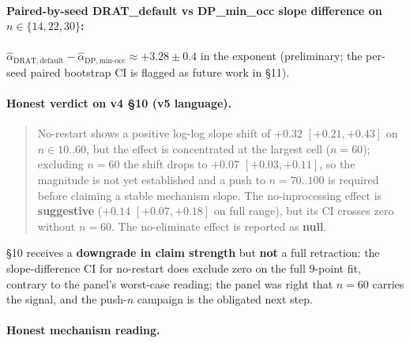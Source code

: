 \documentclass[11pt,a4paper]{article}
\theoremstyle{remark}
\begin{document}
{\paragraph{Paired-by-seed DRAT\_default vs DP\_min\_occ slope difference
on $n \in \{14, 22, 30\}$:} $\widehat\alpha_{\mathrm{DRAT,default}} -
\widehat\alpha_{\mathrm{DP,min\text{-}occ}} \approx +3.28 \pm 0.4$ in the
exponent (preliminary; the per-seed paired bootstrap CI is flagged as
future work in \S11).

\paragraph{Honest verdict on v4 \S10 (v5 language).}

\begin{quote}
No-restart shows a positive log-log slope shift of $+0.32$ $[+0.21,
+0.43]$ on $n \in 10..60$, but the effect is concentrated at the largest
cell ($n=60$); excluding $n=60$ the shift drops to $+0.07$ $[+0.03, +0.11]$,
so the magnitude is not yet established and a push to $n=70..100$ is
required before claiming a stable mechanism slope. The no-inprocessing
effect is \textbf{suggestive} ($+0.14$ $[+0.07, +0.18]$ on full range),
but its CI crosses zero without $n=60$. The no-eliminate effect is
reported as \textbf{null}.
\end{quote}

\S10 receives a \textbf{downgrade in claim strength} but \textbf{not} a
full retraction: the slope-difference CI for no-restart does exclude zero
on the full 9-point fit, contrary to the panel's worst-case reading; the
panel was right that $n=60$ carries the signal, and the push-$n$ campaign
is the obligated next step.

\paragraph{Honest mechanism reading.}

}
\end{document}
